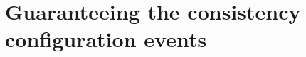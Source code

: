 \section{Guaranteeing the consistency configuration events}\label{sec_triggers_mv_config_ev}



  
  
  
  
  